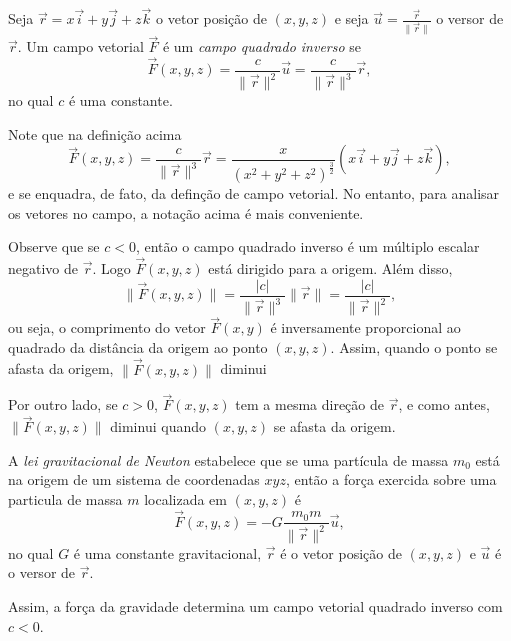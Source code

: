\begin{definition}
    Seja \(\overrightarrow{r} = x\overrightarrow{i} + y\overrightarrow{j} + z\overrightarrow{k}\) o vetor posição de \((x,y,z)\) e seja \(\overrightarrow{u} = \frac{\overrightarrow{r}}{\|\overrightarrow{r}\|}\) o versor de \(\overrightarrow{r}\). Um campo vetorial \(\overrightarrow{F}\) é um \textit{campo quadrado inverso} se \[\overrightarrow{F}(x,y,z) = \frac{c}{\|\overrightarrow{r}\|^2} \overrightarrow{u} = \frac{c}{\|\overrightarrow{r}\|^3} \overrightarrow{r},\] no qual \(c\) é uma constante.
\end{definition}

Note que na definição acima \[\overrightarrow{F}(x,y,z) = \frac{c}{\|\overrightarrow{r}\|^3} \overrightarrow{r} = \frac{x}{(x^2 + y^2 + z^2)^{\frac{3}{2}}}(x\overrightarrow{i} + y\overrightarrow{j} + z\overrightarrow{k}) ,\] e se enquadra, de fato, da definção de campo vetorial. No entanto, para analisar os vetores no campo, a notação acima é mais conveniente.

Observe que se \(c<0\), então o campo quadrado inverso é um múltiplo escalar negativo de \(\overrightarrow{r}\). Logo \(\overrightarrow{F}(x,y,z)\) está dirigido para a origem. Além disso, \[\|\overrightarrow{F}(x,y,z)\| = \frac{|c|}{\|\overrightarrow{r}\|^3} \|\overrightarrow{r}\| = \frac{|c|}{\|\overrightarrow{r}\|^2},\] ou seja, o comprimento do vetor \(\overrightarrow{F}(x,y)\) é inversamente proporcional ao quadrado da distância da origem ao ponto \((x,y,z)\). Assim, quando o ponto se afasta da origem, \(\|\overrightarrow{F}(x,y,z)\|\) diminui

Por outro lado, se \(c>0\), \(\overrightarrow{F}(x,y,z)\) tem a mesma direção de \(\overrightarrow{r}\), e como antes, \(\|\overrightarrow{F}(x,y,z)\|\) diminui quando \((x,y,z)\) se afasta da origem.

\begin{example}
    A \textit{lei gravitacional de Newton} estabelece que se uma partícula de massa \(m_0\) está na origem de um sistema de coordenadas \(xyz\), então a força exercida sobre uma particula de massa \(m\) localizada em \((x,y,z)\) é \[\overrightarrow{F}(x,y,z) = -G \frac{m_0 m}{\|\overrightarrow{r}\|^2} \overrightarrow{u},\] no qual \(G\) é uma constante gravitacional, \(\overrightarrow{r}\) é o vetor posição de \((x,y,z)\) e \(\overrightarrow{u}\) é o versor de \(\overrightarrow{r}\).

    Assim, a força da gravidade determina um campo vetorial quadrado inverso com \(c<0\).
\end{example}

